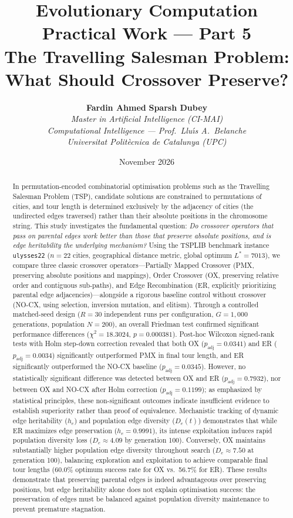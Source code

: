\documentclass[10pt,a4paper]{article}
\title{\Large\textbf{Evolutionary Computation Practical Work --- Part 5 \\
The Travelling Salesman Problem: What Should Crossover Preserve?}}
\author{
    \textbf{Fardin Ahmed} \qquad \textbf{Sparsh Dubey} \\
    \textit{Master in Artificial Intelligence (CI-MAI)} \\
    \textit{Computational Intelligence --- Prof.~Llu\'{\i}s A.~Belanche} \\
    \textit{Universitat Polit\`ecnica de Catalunya (UPC)}
}
\date{November 2026}
\begin{document}
\maketitle

\begin{abstract}
\noindent In permutation-encoded combinatorial optimisation problems such as the Travelling Salesman Problem (TSP), candidate solutions are constrained to permutations of cities, and tour length is determined exclusively by the adjacency of cities (the undirected edges traversed) rather than their absolute positions in the chromosome string. This study investigates the fundamental question: \emph{Do crossover operators that pass on parental edges work better than those that preserve absolute positions, and is edge heritability the underlying mechanism?} Using the TSPLIB benchmark instance \texttt{ulysses22} ($n=22$ cities, geographical distance metric, global optimum $L^* = 7013$), we compare three classic crossover operators---Partially Mapped Crossover (PMX, preserving absolute positions and mappings), Order Crossover (OX, preserving relative order and contiguous sub-paths), and Edge Recombination (ER, explicitly prioritizing parental edge adjacencies)---alongside a rigorous baseline control without crossover (NO-CX, using selection, inversion mutation, and elitism). Through a controlled matched-seed design ($R=30$ independent runs per configuration, $G=1{,}000$ generations, population $N=200$), an overall Friedman test confirmed significant performance differences ($\chi^2 = 18.3024$, $p = 0.000381$). Post-hoc Wilcoxon signed-rank tests with Holm step-down correction revealed that both OX ($p_{\text{adj}} = 0.0341$) and ER ($p_{\text{adj}} = 0.0034$) significantly outperformed PMX in final tour length, and ER significantly outperformed the NO-CX baseline ($p_{\text{adj}} = 0.0345$). However, no statistically significant difference was detected between OX and ER ($p_{\text{adj}} = 0.7932$), nor between OX and NO-CX after Holm correction ($p_{\text{adj}} = 0.1199$); as emphasized by statistical principles, these non-significant outcomes indicate insufficient evidence to establish superiority rather than proof of equivalence. Mechanistic tracking of dynamic edge heritability ($h_e$) and population edge diversity ($D_e(t)$) demonstrates that while ER maximizes edge preservation ($h_e = 0.9991$), its intense exploitation induces rapid population diversity loss ($D_e \approx 4.09$ by generation 100). Conversely, OX maintains substantially higher population edge diversity throughout search ($D_e \approx 7.50$ at generation 100), balancing exploration and exploitation to achieve comparable final tour lengths (60.0\% optimum success rate for OX vs.~56.7\% for ER). These results demonstrate that preserving parental edges is indeed advantageous over preserving positions, but edge heritability alone does not explain optimisation success: the preservation of edges must be balanced against population diversity maintenance to prevent premature stagnation.
\end{abstract}
\end{document}
